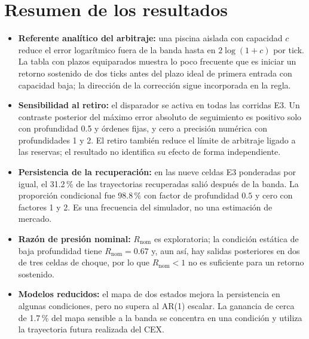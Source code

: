\section{Resumen de los resultados}

\begin{itemize}
  \item \textbf{Referente analítico del arbitraje:} una piscina aislada con capacidad $c$ reduce el error logarítmico fuera de la banda hasta en $2\log(1+c)$ por tick. La tabla con plazos equiparados muestra lo poco frecuente que es iniciar un retorno sostenido de dos ticks antes del plazo ideal de primera entrada con capacidad baja; la dirección de la corrección sigue incorporada en la regla.
  \item \textbf{Sensibilidad al retiro:} el disparador se activa en todas las corridas E3. Un contraste posterior del máximo error absoluto de seguimiento es positivo solo con profundidad 0.5 y órdenes fijas, y cero a precisión numérica con profundidades 1 y 2. El retiro también reduce el límite de arbitraje ligado a las reservas; el resultado no identifica su efecto de forma independiente.
  \item \textbf{Persistencia de la recuperación:} en las nueve celdas E3 ponderadas por igual, el 31.2\,\% de las trayectorias recuperadas salió después de la banda. La proporción condicional fue 98.8\,\% con factor de profundidad $0.5$ y cero con factores 1 y 2. Es una frecuencia del simulador, no una estimación de mercado.
  \item \textbf{Razón de presión nominal:} $R_{\mathrm{nom}}$ es exploratoria; la condición estática de baja profundidad tiene $R_{\mathrm{nom}}=0.67$ y, aun así, hay salidas posteriores en dos de tres celdas de choque, por lo que $R_{\mathrm{nom}}<1$ no es suficiente para un retorno sostenido.
  \item \textbf{Modelos reducidos:} el mapa de dos estados mejora la persistencia en algunas condiciones, pero no supera al AR(1) escalar. La ganancia de cerca de 1.7\,\% del mapa sensible a la banda se concentra en una condición y utiliza la trayectoria futura realizada del CEX.
\end{itemize}
